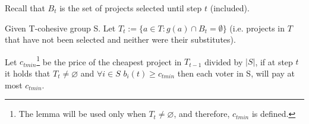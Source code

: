 \documentclass[runningheads]{llncs}
\newcommand{\kibitz}[2]{\ifnum\Comments=1{\color{#1}{#2}}\fi}
\newcommand{\rf}[1]{\kibitz{blue}{[Roy says:#1]}}
\begin{document}
Recall that $B_t$ is the set of projects selected until step $t$ (included).


\begin{lemma}\label{lemma:substitutes}
Given T-cohesive group S.  Let $T_t:=\{a\in T: g(a)\cap B_t = \emptyset\}$ (i.e. projects in $T$ that have not been selected and neither were their substitutes).




Let $c_{tmin}$\footnote{The lemma will be used only when $T_t\neq\varnothing$, and therefore, $c_{tmin}$ is defined.} be the price of the cheapest project in $T_{t-1}$ divided by $|S|$,
if at step $t$ it holds that $T_t\neq\varnothing$ and $\forall i\in S$ $b_i(t)\geq c_{tmin}$ then each voter in S, will pay at most $c_{tmin}$.

\end{lemma}
\end{document}
